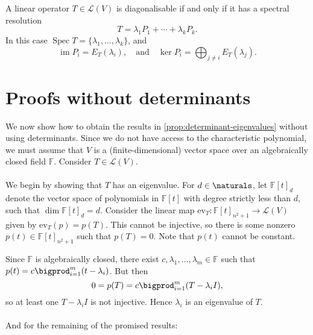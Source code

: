 \documentclass[a4paper, 11pt]{memoir}
\numberwithin{equation}{chapter}
\newcommand{\calL}{\mathcal{L}}
\DeclareMathOperator{\spec}{Spec}
\newcommand{\field}{\mathbb{F}}
\newcommand{\im}{\operatorname{im}}
\newcommand{\newpar}{\paragraph{}}
\begin{document}
\begin{propositionnoproof}
    A linear operator $T \in \calL(V)$ is diagonalisable if and only if it has a spectral resolution
    \begin{equation*}
        T
            = \lambda_1 P_1 + \cdots + \lambda_k P_k.
    \end{equation*}
    In this case $\spec T = \{\lambda_1, \ldots, \lambda_k\}$, and
    \begin{equation*}
        \im P_i = E_T(\lambda_i),
        \quad \text{and} \quad
        \ker P_i = \bigoplus_{j \neq i} E_T(\lambda_j).
    \end{equation*}
\end{propositionnoproof}



\section{Proofs without determinants}

\newcommand{\ev}{\mathrm{ev}}

We now show how to obtain the results in \cref{prop:determinant-eigenvalues} without using determinants. Since we do not have access to the characteristic polynomial, we must assume that $V$ is a (finite-dimensional) vector space over an algebraically closed field $\field$. Consider $T \in \calL(V)$.


\newpar

We begin by showing that $T$ has an eigenvalue. For $d \in \naturals$, let $\field[t]_d$ denote the vector space of polynomials in $\field[t]$ with degree strictly less than $d$, such that $\dim \field[t]_d = d$. Consider the linear map $\ev_T \colon \field[t]_{n^2+1} \to \calL(V)$ given by $\ev_T(p) = p(T)$. This cannot be injective, so there is some nonzero $p(t) \in \field[t]_{n^2+1}$ such that $p(T) = 0$. Note that $p(t)$ cannot be constant.

Since $\field$ is algebraically closed, there exist $c, \lambda_1, \ldots, \lambda_m \in \field$ such that $p(t) = c \bigprod_{i=1}^m (t - \lambda_i)$. But then
%
\begin{equation*}
    0
        = p(T)
        = c \bigprod_{i=1}^m (T - \lambda_i I),
\end{equation*}
%
so at least one $T - \lambda_i I$ is not injective. Hence $\lambda_i$ is an eigenvalue of $T$.


\newpar

And for the remaining of the promised results:
\end{document}
